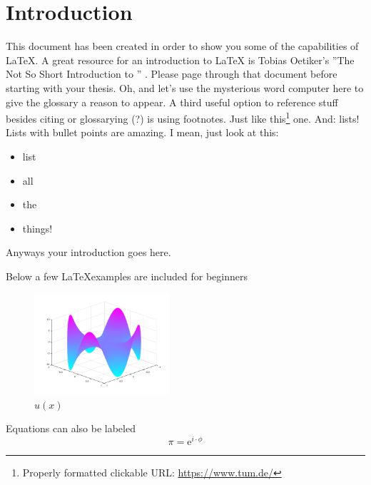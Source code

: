 \chapter{Introduction}
\label{chapter:Introduction}
	This document has been created in order to show you some of the capabilities 
of \LaTeX.  A great resource for an introduction to \LaTeX\xspace is Tobias
Oetiker's ''The Not So Short Introduction to \LaTeXe'' \cite{latex}.  Please
page through that document
before starting with your thesis.
Oh, and let's use the mysterious word \gls{computer} here to give the glossary
a reason to appear.
A third useful option to reference stuff besides citing or glossarying (?) 
is using footnotes. Just like
this\footnote{Properly formatted clickable URL: \url{https://www.tum.de/}}
one.
And: lists! Lists with bullet points are amazing. I mean, just look at this:
\begin{itemize}
	\item list
	\item all 
	\item the 
	\item things!
\end{itemize}
\par
Anyways your introduction goes here.


Below a few \LaTeX examples are included for beginners
\begin{figure}[ht]
  \centering
  \includegraphics[width=5cm]{images/swing_function_plot.png}
  \caption{$u(x)$}%
  \label{fig:swingPlot}
\end{figure}


Equations can also be labeled
\begin{equation}
	\pi = \mathrm{e}^{i\cdot\phi}
	\label{eq:equation1}
\end{equation}


